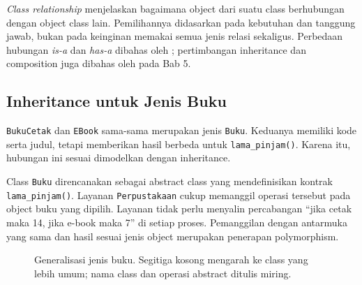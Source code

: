 \emph{Class relationship} menjelaskan bagaimana object dari suatu class berhubungan dengan object class lain. Pemilihannya didasarkan pada kebutuhan dan tanggung jawab, bukan pada keinginan memakai semua jenis relasi sekaligus. Perbedaan hubungan \emph{is-a} dan \emph{has-a} dibahas oleh \cite{lutz2025learning}; pertimbangan inheritance dan composition juga dibahas oleh \cite{north2025oop} pada Bab 5.

\subsection{Inheritance untuk Jenis Buku}

\texttt{BukuCetak} dan \texttt{EBook} sama-sama merupakan jenis \texttt{Buku}. Keduanya memiliki kode serta judul, tetapi memberikan hasil berbeda untuk \texttt{lama\_pinjam()}. Karena itu, hubungan ini sesuai dimodelkan dengan inheritance.

Class \texttt{Buku} direncanakan sebagai abstract class yang mendefinisikan kontrak \texttt{lama\_pinjam()}. Layanan \texttt{Perpustakaan} cukup memanggil operasi tersebut pada object buku yang dipilih. Layanan tidak perlu menyalin percabangan ``jika cetak maka 14, jika e-book maka 7'' di setiap proses. Pemanggilan dengan antarmuka yang sama dan hasil sesuai jenis object merupakan penerapan polymorphism.

\begin{figure}[htbp]
\centering
{}
\caption{Generalisasi jenis buku. Segitiga kosong mengarah ke class yang lebih umum; nama class dan operasi abstract ditulis miring.}
\label{fig:b11-inheritance}
\end{figure}

